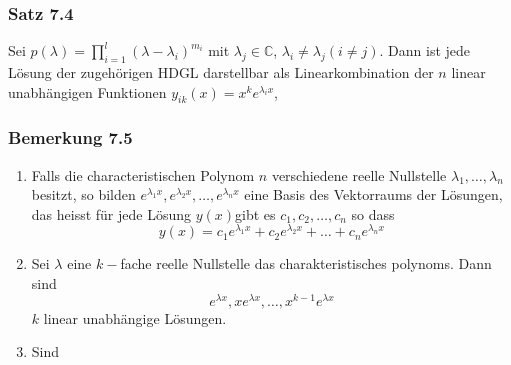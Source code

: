 \subsubsection*{Satz 7.4}
Sei $p(\lambda ) = \prod\limits_{i = 1}^l {{{(\lambda  - {\lambda _i})}^{{m_i}}}} $ mit $\lambda _j\in\mathbb{C}$, $\lambda_i\not=\lambda_j (i\not=j)$. Dann ist jede Lösung der zugehörigen HDGL darstellbar als Linearkombination der $n$ linear unabhängigen Funktionen $y_{ik}(x)=x^ke^{\lambda_ix}$, 

\subsubsection*{Bemerkung 7.5}
\begin{enumerate}
\item Falls die characteristischen Polynom $n$ verschiedene reelle Nullstelle $\lambda_1,\dots,\lambda_n$ besitzt, so bilden ${e^{{\lambda _1}x}},{e^{{\lambda _2}x}}, \ldots ,{e^{{\lambda _n}x}}$ eine Basis des Vektorraums der Lösungen, das heisst für jede Lösung $y(x)$gibt es $c_1,c_2,\dots,c_n$ so dass $$y(x)={c_1}{e^{{\lambda _1}x}} + {c_2}{e^{{\lambda _2}x}} +  \ldots  + {c_n}{e^{{\lambda _n}x}}$$

\item Sei $\lambda$ eine $k-$fache reelle Nullstelle das charakteristisches polynoms. Dann sind $$e^{\lambda x},xe^{\lambda x},\dots ,x^{k-1}e^{\lambda x}$$ $k$ linear unabhängige Lösungen. 
\item Sind 
\end{enumerate}
